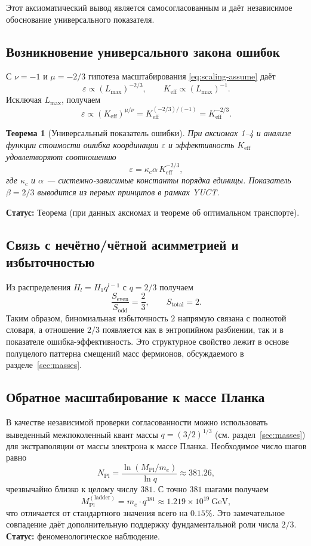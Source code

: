 \documentclass[11pt,a4paper]{article}
\newtheorem{theorem}{Теорема}[section]
\newcommand{\Mpl}{M_{\mathrm{Pl}}}
\begin{document}
	Этот аксиоматический вывод является самосогласованным и даёт независимое обоснование универсального показателя.
	
	\subsection{Возникновение универсального закона ошибок}
	С \(\nu = -1\) и \(\mu = -2/3\) гипотеза масштабирования \eqref{eq:scaling-assume} даёт
	\[
	\varepsilon \propto (L_{\max})^{-2/3}, \qquad K_{\mathrm{eff}} \propto (L_{\max})^{-1}.
	\]
	Исключая \(L_{\max}\), получаем
	\[
	\varepsilon \propto (K_{\mathrm{eff}})^{\mu/\nu} = K_{\mathrm{eff}}^{(-2/3)/(-1)} = K_{\mathrm{eff}}^{-2/3}.
	\]
	
	\begin{theorem}[Универсальный показатель ошибки]
		При аксиомах 1–4 и анализе функции стоимости ошибка координации \(\varepsilon\) и эффективность \(K_{\mathrm{eff}}\) удовлетворяют соотношению
		\[
		\boxed{\varepsilon = \kappa_c \alpha \, K_{\mathrm{eff}}^{-2/3}},
		\]
		где \(\kappa_c\) и \(\alpha\) — системно-зависимые константы порядка единицы. Показатель \(\beta = 2/3\) выводится из первых принципов в рамках YUCT.
	\end{theorem}
	\textbf{Статус:} Теорема (при данных аксиомах и теореме об оптимальном транспорте).
	
	\subsection{Связь с нечётно/чётной асимметрией и избыточностью}
	Из распределения \(H_l = H_1 q^{l-1}\) с \(q=2/3\) получаем
	\[
	\frac{S_{\mathrm{even}}}{S_{\mathrm{odd}}} = \frac{2}{3}, \qquad S_{\mathrm{total}} = 2.
	\]
	Таким образом, биномиальная избыточность \(2\) напрямую связана с полнотой словаря, а отношение \(2/3\) появляется как в энтропийном разбиении, так и в показателе ошибка-эффективность. Это структурное свойство лежит в основе полуцелого паттерна смещений масс фермионов, обсуждаемого в разделе~\ref{sec:masses}.
	
	\subsection{Обратное масштабирование к массе Планка}
	В качестве независимой проверки согласованности можно использовать выведенный межпоколенный квант массы \(q = (3/2)^{1/3}\) (см. раздел~\ref{sec:masses}) для экстраполяции от массы электрона к массе Планка. Необходимое число шагов равно
	\[
	N_{\mathrm{Pl}} = \frac{\ln(\Mpl/m_e)}{\ln q} \approx 381.26,
	\]
	чрезвычайно близко к целому числу \(381\). С точно \(381\) шагами получаем
	\[
	\Mpl^{\mathrm{(ladder)}} = m_e \cdot q^{381} \approx 1.219\times10^{19}\ \mathrm{GeV},
	\]
	что отличается от стандартного значения всего на \(0.15\%\). Это замечательное совпадение даёт дополнительную поддержку фундаментальной роли числа \(2/3\). \textbf{Статус:} феноменологическое наблюдение.
	
\end{document}
